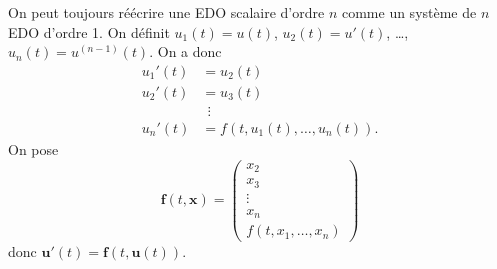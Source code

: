 On peut toujours réécrire une EDO scalaire d'ordre $n$ comme un système de $n$ EDO d'ordre 1. On définit $u_{1}(t)=u(t)$, $u_{2}(t)=u'(t)$, \dots, $u_{n}(t)=u^{(n-1)}(t)$. On a donc
\begin{align*}
u_{1}'(t) & =u_{2}(t) \\
u_{2}'(t) & =u_{3}(t) \\
 & ~~\vdots \\
u_{n}'(t) & =f(t,u_{1}(t),\dots,u_{n}(t)). 
\end{align*}
On pose
$$
\boldsymbol{f}(t,\boldsymbol{x})=\begin{pmatrix}
x_{2} \\
x_{3} \\
\vdots \\
x_{n} \\
f(t,x_{1},\dots,x_{n})
\end{pmatrix}
$$
donc $\boldsymbol{u}'(t)=\boldsymbol{f}(t,\boldsymbol{u}(t))$.
